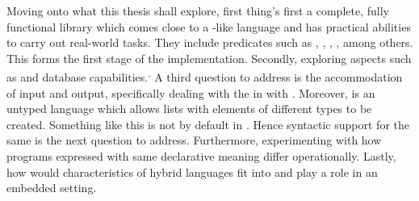 \documentclass[thesis-solanki.tex]{subfiles}
\begin{document}
Moving onto what this thesis shall explore, first thing's first a complete, fully functional library which comes
close to a -like language and has practical abilities to carry out real-world
tasks.
They include predicates such as 
, , , ,  among others.
This forms
the first stage of the implementation.
Secondly, exploring aspects such as  and database capabilities.\textsuperscript{,}
A third question to address is the accommodation of input and output, specifically dealing with the  in  with  .
Moreover,  is an untyped language which allows lists with elements of different types to be
created.
Something like this is not by default in .
Hence syntactic support for the same is the next question to address.
Furthermore, experimenting with how programs expressed with same declarative meaning differ
operationally. 
Lastly, how would characteristics of hybrid languages fit into and play a role in an embedded
setting. 
\end{document}
